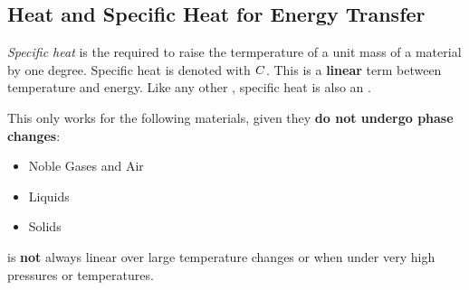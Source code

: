 \subsection{Heat and Specific Heat for Energy Transfer}\label{subsec:Heat_Specific_Heat_Energy_Transfer}
\begin{definition}\label{def:Specific_Heat}
  \emph{Specific heat} is the  required to raise the termperature of a unit mass of a material by one degree.
  Specific heat is denoted with $C$.
  This is a \textbf{linear} term between temperature and energy.
  Like any other , specific heat is also an .

  \begin{remark}
    This  only works for the following materials, given they \textbf{do not undergo phase changes}:
    \begin{itemize}[noitemsep]
    \item Noble Gases and Air
    \item Liquids
    \item Solids
    \end{itemize}
  \end{remark}

  \begin{remark}
     is \textbf{not} always linear over large temperature changes or when under very high pressures or temperatures.
  \end{remark}
\end{definition}


